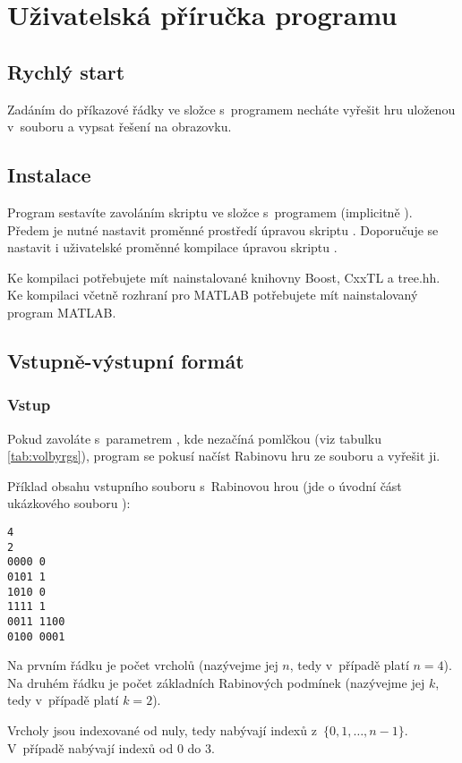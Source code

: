 \chapter{Uživatelská příručka programu \rgsexe} \label{chap:rgsmanual}
\section{Rychlý start}
Zadáním  do příkazové řádky ve složce s~programem \rgsexe{} necháte \rgsexe{} vyřešit hru uloženou v~souboru  a vypsat řešení na obrazovku.
\section{Instalace} \label{sec:rgsmanual:instalace}
Program \rgsexe{} sestavíte zavoláním skriptu  ve složce s~programem (implicitně ). Předem je nutné nastavit proměnné prostředí úpravou skriptu  . Doporučuje se nastavit i uživatelské proměnné kompilace úpravou skriptu .

Ke kompilaci \rgsexe{} potřebujete mít nainstalované knihovny Boost, CxxTL a tree.hh. Ke kompilaci včetně rozhraní pro MATLAB potřebujete mít nainstalovaný program MATLAB.
\section{Vstupně-výstupní formát}
\subsection{Vstup}
Pokud zavoláte \rgsexe{} s~parametrem , kde  nezačíná pomlčkou (viz tabulku \ref{tab:volbyrgs}), program se pokusí načíst Rabinovu hru ze souboru  a vyřešit ji.

Příklad obsahu vstupního souboru s~Rabinovou hrou (jde o úvodní část ukázkového souboru ):
\begin{verbatim}
4
2
0000 0
0101 1
1010 0
1111 1
0011 1100
0100 0001
\end{verbatim}
Na prvním řádku je počet vrcholů (nazývejme jej $n$, tedy v~případě  platí $n = 4$). Na druhém řádku je počet základních Rabinových podmínek (nazývejme jej $k$, tedy v~případě  platí $k = 2$).

Vrcholy jsou indexované od nuly, tedy nabývají indexů z~$\{0, 1, \dotsc, n-1\}$. V~případě  nabývají indexů od $0$ do $3$.

